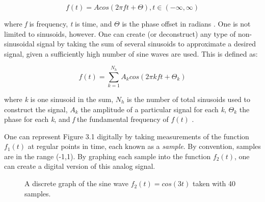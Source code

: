\begin{defn}\label{def1}
	\begin{equation}\label{introf(t)}
	f(t)=Acos(2\pi ft + \varTheta), t \in (-\infty, \infty)
\end{equation}\end{defn}

where \textit{f} is frequency, \textit{t} is time, and $\varTheta$ is the phase offset in radians \cite{Symons_2013}. One is not limited to sinusoids, however. One can create (or deconstruct) any type of non-sinusoidal signal by taking the sum of several sinusoids to approximate a desired signal, given a sufficiently high number of sine waves are used. This is defined as:

\begin{defn}\label{def1}
	\begin{equation}\label{intro2f(t)}
	f(t)=\sum_{k=1}^{N_h} A_k cos(2\pi kft + \varTheta_k)
\end{equation}\end{defn}

where \textit{k} is one sinusoid in the sum, $N_h$ is the number of total sinusoids used to construct the signal, $A_k$ the amplitude of a particular signal for each \textit{k}, $\varTheta_k$ the phase for each \textit{k}, and \textit{f} the fundamental frequency of $f(t)$ \cite{Symons_2013}.

One can represent Figure 3.1 digitally by taking measurements of the function \(f_1(t)\) at regular points in time, each known as a \textit{sample}. By convention, samples are in the range (-1,1). By graphing each sample into the function \(f_2(t)\), one can create a digital version of this analog signal.

\begin{figure}[h] %
	\begin{center}
		\caption{A discrete graph of the sine wave \(f_2(t) = cos(3t)\) taken with 40 samples.}
	\end{center}
\end{figure}

